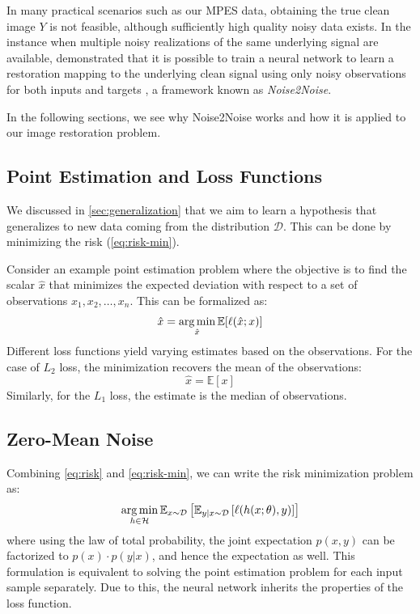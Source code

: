 In many practical scenarios such as our \gls{MPES} data, obtaining the true clean image $Y$ is not feasible, although sufficiently high quality noisy data exists. In the instance when multiple noisy realizations of the same underlying signal are available, \citeauthor{lehtinenNoise2NoiseLearningImage2018} demonstrated that it is possible to train a neural network to learn a restoration mapping to the underlying clean signal using only noisy observations for both inputs and targets \cite{lehtinenNoise2NoiseLearningImage2018}, a framework known as \textit{Noise2Noise}. 

In the following sections, we see why Noise2Noise works and how it is applied to our image restoration problem.
\subsection{Point Estimation and Loss Functions}
We discussed in \cref{sec:generalization} that we aim to learn a hypothesis that generalizes to new data coming from the distribution $\mathcal{D}$. This can be done by minimizing the risk (\cref{eq:risk-min}). 

Consider an example point estimation problem where the objective is to find the scalar $\hat{x}$ that minimizes the expected deviation with respect to a set of observations $x_1, x_2, \dots, x_n$. This can be formalized as:
\begin{equation}
    \hat{x} = \operatorname*{arg\,min}_{\hat{x}} \mathbb{E}[\ell(\hat{x}; x)]
\end{equation}
Different loss functions yield varying estimates based on the observations. For the case of $L_2$ loss, the minimization recovers the mean of the observations:
\begin{equation}\label{eq:l2-estimate}
    \hat{x} = \mathbb{E}[x]
\end{equation}
Similarly, for the $L_1$ loss, the estimate is the median of observations.

\subsection{Zero-Mean Noise}
Combining \cref{eq:risk} and \cref{eq:risk-min}, we can write the risk minimization problem as:
\begin{equation}
    \operatorname*{arg\,min}_{h \in \mathcal{H}} \mathbb{E}_{x \sim \mathcal{D}} \left[\mathbb{E}_{y|x \sim \mathcal{D}} \left[ \ell(h(x; \theta), y) \right]\right]
\end{equation}
where using the law of total probability, the joint expectation $p(x,y)$ can be factorized to $p(x) \cdot p(y | x)$, and hence the expectation as well. This formulation is equivalent to solving the point estimation problem for each input sample separately. Due to this, the neural network inherits the properties of the loss function.

